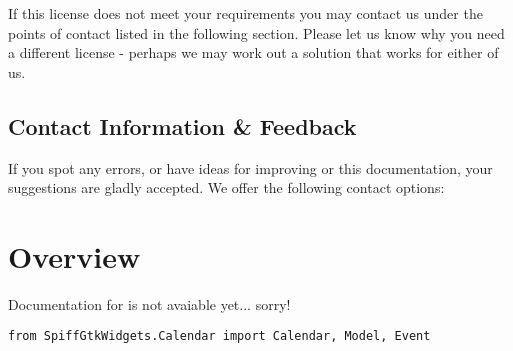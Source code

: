 If this license does not meet your requirements you may contact us under 
the points of contact listed in the following section. Please let us know 
why you need a different license - perhaps we may work out a solution 
that works for either of us.


\subsection{Contact Information \& Feedback}

If you spot any errors, or have ideas for improving \product or this 
documentation, your suggestions are gladly accepted.
We offer the following contact options: \\



\newpage
\section{Overview}

Documentation for \product is not avaiable yet... sorry!

\begin{lstlisting}
from SpiffGtkWidgets.Calendar import Calendar, Model, Event
\end{lstlisting}


